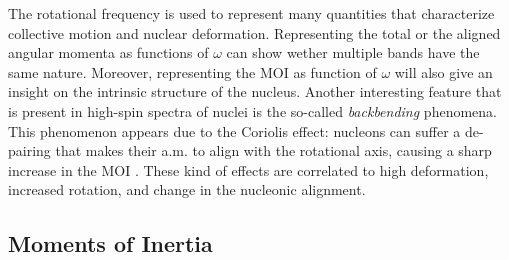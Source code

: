 The rotational frequency is used to represent many quantities that characterize collective motion and nuclear deformation. Representing the total or the aligned angular momenta as functions of $\omega$ can show wether multiple bands have the same nature. Moreover, representing the MOI as function of $\omega$ will also give an insight on the intrinsic structure of the nucleus. Another interesting feature that is present in high-spin spectra of nuclei is the so-called \emph{backbending} phenomena. This phenomenon appears due to the Coriolis effect: nucleons can suffer a de-pairing that makes their a.m. to align with the rotational axis, causing a sharp increase in the MOI \cite{ring2004nuclear,kvasil2004backbending}. These kind of effects are correlated to high deformation, increased rotation, and change in the nucleonic alignment.

\subsection{Moments of Inertia}

